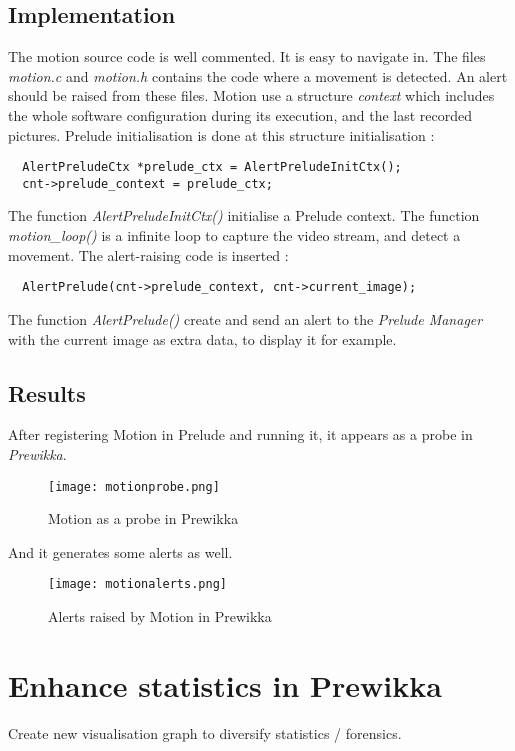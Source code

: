 \documentclass{koala-en}
\begin{document}
\subsection{Implementation}
The motion source code is well commented. It is easy to navigate in.
\newline
\newline
The files \emph{motion.c} and \emph{motion.h} contains the code where a movement is detected. An alert should be raised from these files.
\newline
\newline
Motion use a structure \emph{context} which includes the whole software configuration during its execution, and the last recorded pictures.
Prelude initialisation is done at this structure initialisation :
\begin{lstlisting}
  AlertPreludeCtx *prelude_ctx = AlertPreludeInitCtx();
  cnt->prelude_context = prelude_ctx;
\end{lstlisting}
The function \emph{AlertPreludeInitCtx()} initialise a Prelude context.
\newline
\newline
The function \emph{motion\_loop()} is a infinite loop to capture the video stream, and detect a movement. The alert-raising code is inserted :
\begin{lstlisting}
  AlertPrelude(cnt->prelude_context, cnt->current_image);
\end{lstlisting}
The function \emph{AlertPrelude()} create and send an alert to the \emph{Prelude Manager} with the current image as extra data, to display it for example.

\subsection{Results}
After registering Motion in Prelude and running it, it appears as a probe in \emph{Prewikka}.
\begin{figure}[!ht]
  \center
  \texttt{[image: motionprobe.png]}
  \caption{Motion as a probe in Prewikka}
\end{figure}

And it generates some alerts as well.
\begin{figure}[!ht]
  \center
  \texttt{[image: motionalerts.png]}
  \caption{Alerts raised by Motion in Prewikka}
\end{figure}

\section{Enhance statistics in Prewikka}
Create new visualisation graph to diversify statistics / forensics.
\end{document}
